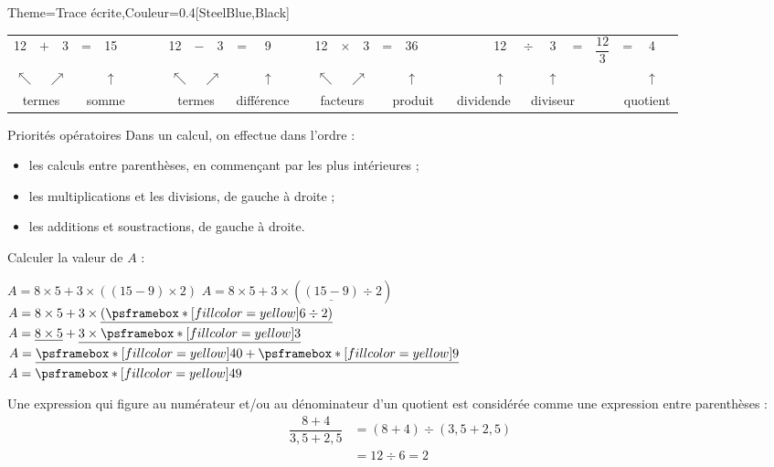 \begin{Maquette}[Cours]{Theme={Trace écrite},Couleur={0.4[SteelBlue,Black]}}
      {\setlength{\tabcolsep}{4pt}
      \begin{tabular}{*{7}{c}|*{7}{c}|*{8}{c}|*{10}{c}}
         12 & $+$ & 3 & = &15 &&&& 12 & $-$ & 3 & = & 9 &&& 12 & $\times$ & 3 & = & 36 &&&&& 12 & $\div$ & 3  & = & $\dfrac{12}{3}$ & = & 4 & \\
         \multicolumn{3}{c}{$\nwarrow \quad \nearrow$} & & $\uparrow$ &&&& \multicolumn{3}{c}{$\nwarrow \quad \nearrow$} & & $\uparrow$ &&& \multicolumn{3}{c}{$\nwarrow \quad \nearrow$} & & $\uparrow$ &&&&& $\uparrow$ & & $\uparrow$ & & & & $\uparrow$ & \\
         \multicolumn{3}{c}{\small termes} & \multicolumn{3}{c}{\small somme} &&& \multicolumn{3}{c}{\small termes} & \multicolumn{3}{c|}{\small différence} && \multicolumn{3}{c}{\small facteurs} & \multicolumn{4}{c|}{\small produit} & \multicolumn{3}{c}{\small dividende} & \multicolumn{3}{c}{\small diviseur} & & \multicolumn{3}{c}{\small quotient} \\
      \end{tabular}}

      \begin{methode*}{Priorités opératoires}
         Dans un calcul, on effectue dans l'ordre :
         \begin{itemize}
            \item les calculs entre parenthèses, en commençant par les plus intérieures ;
            \item les multiplications et les divisions, de gauche à droite ;
            \item les additions et soustractions, de gauche à droite.
         \end{itemize}
         \begin{exmethode}
            Calculer la valeur de $A$ : \par
            $A =8\times5+3\times((15-9)\times2)$
            \tcblower
               $A =8\times5+3\times(\underline{(15-9)}\div2)$ \\
               $A =8\times5+3\times\underline{(\psframebox*[fillcolor=yellow]{6}\div2)}$ \\
               $A =\underline{8\times5}+\underline{3\times\psframebox*[fillcolor=yellow]{3}}$ \\
               $A =\underline{\psframebox*[fillcolor=yellow]{40}+\psframebox*[fillcolor=yellow]{9}}$ \\
               $A = \psframebox*[fillcolor=yellow]{49}$
         \end{exmethode}
      \end{methode*}

      Une expression qui figure au numérateur et/ou au dénominateur d'un quotient est considérée comme une expression entre parenthèses : \vskip-8mm
      \begin{align*}
         \dfrac{8+4}{3,5+2,5} & = (8+4)\div(3,5+2,5) \\
         &=12\div6 =2
      \end{align*}

\end{Maquette}


